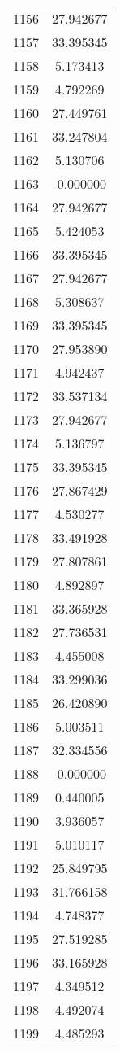 \documentclass[12pt]{article}
\begin{document}
\begin{longtable}{@{}cc@{}}
1156 & 27.942677 \\
1157 & 33.395345 \\
1158 & 5.173413 \\
1159 & 4.792269 \\
1160 & 27.449761 \\
1161 & 33.247804 \\
1162 & 5.130706 \\
1163 & -0.000000 \\
1164 & 27.942677 \\
1165 & 5.424053 \\
1166 & 33.395345 \\
1167 & 27.942677 \\
1168 & 5.308637 \\
1169 & 33.395345 \\
1170 & 27.953890 \\
1171 & 4.942437 \\
1172 & 33.537134 \\
1173 & 27.942677 \\
1174 & 5.136797 \\
1175 & 33.395345 \\
1176 & 27.867429 \\
1177 & 4.530277 \\
1178 & 33.491928 \\
1179 & 27.807861 \\
1180 & 4.892897 \\
1181 & 33.365928 \\
1182 & 27.736531 \\
1183 & 4.455008 \\
1184 & 33.299036 \\
1185 & 26.420890 \\
1186 & 5.003511 \\
1187 & 32.334556 \\
1188 & -0.000000 \\
1189 & 0.440005 \\
1190 & 3.936057 \\
1191 & 5.010117 \\
1192 & 25.849795 \\
1193 & 31.766158 \\
1194 & 4.748377 \\
1195 & 27.519285 \\
1196 & 33.165928 \\
1197 & 4.349512 \\
1198 & 4.492074 \\
1199 & 4.485293 \\

\end{longtable}
\end{document}

